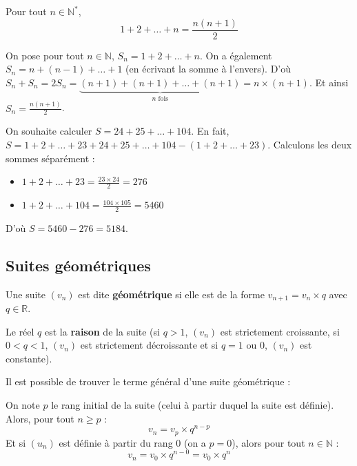 	\begin{formula}
		Pour tout $n \in \mathbb{N}^*$,
		\[ 1 + 2 + \dots + n = \frac{n(n + 1)}{2} \]
	\end{formula}
	
	\begin{demonstration}
		On pose pour tout $n \in \mathbb{N}$, $S_n = 1 + 2 + \dots + n$. On a également $S_n = n + (n-1) + \dots + 1$ (en écrivant la somme à l'envers).
		\newline
		D'où $S_n + S_n = 2S_n = \underbrace{(n + 1) + (n + 1) + \dots + (n + 1)}_{n \text{ fois}} = n \times (n + 1)$. Et ainsi $S_n = \frac{n(n + 1)}{2}$.
	\end{demonstration}
	
	\begin{tip}[Exemple]
		On souhaite calculer $S = 24 + 25 + \dots + 104$.
		\newpar
		En fait, $S = 1 + 2 + \dots + 23 + 24 + 25 + \dots + 104 - (1 + 2 + \dots + 23)$. Calculons les deux sommes séparément :
		\begin{itemize}
			\item $1 + 2 + \dots + 23 = \frac{23 \times 24}{2} = 276$
			\item $1 + 2 + \dots + 104 = \frac{104 \times 105}{2} = 5460$
		\end{itemize}
		D'où $S = 5460 - 276 = 5184$.
	\end{tip}
	
	\subsection{Suites géométriques}
	
	\begin{formula}[Définition]
		Une suite $(v_n)$ est dite \textbf{géométrique} si elle est de la forme $v_{n+1} = v_n \times q$ avec $q \in \mathbb{R}$.
	\end{formula}
	
	\begin{formula}[Raison]
		Le réel $q$ est la \textbf{raison} de la suite (si $q > 1$, $(v_n)$ est strictement croissante, si $0 < q < 1$, $(v_n)$ est strictement décroissante et si $q = 1$ ou $0$, $(v_n)$ est constante).
	\end{formula}
	
	Il est possible de trouver le terme général d'une suite géométrique :
	
	\begin{formula}
		On note $p$ le rang initial de la suite (celui à partir duquel la suite est définie). Alors, pour tout $n \geq p$ :
		\[ v_n = v_p \times q^{n-p} \]
		Et si $(u_n)$ est définie à partir du rang $0$ (on a $p = 0$), alors pour tout $n \in \mathbb{N}$ :
		\[ v_n = v_0 \times q^{n-0} = v_0 \times q^n \]
	\end{formula}
	
